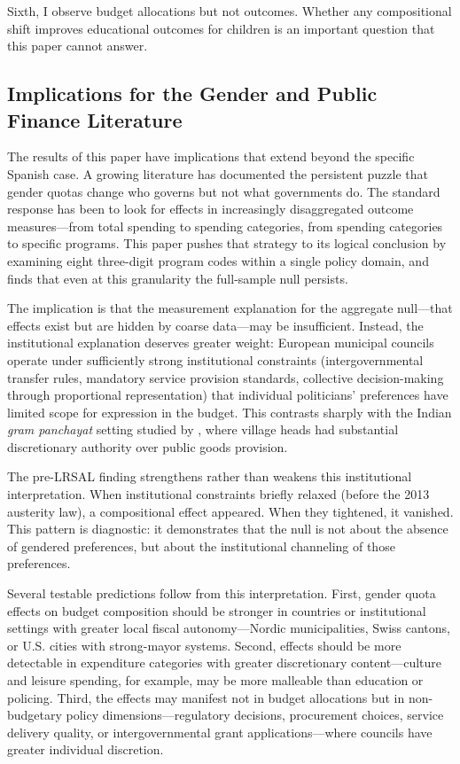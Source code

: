\documentclass[12pt]{article}
\begin{document}
Sixth, I observe budget allocations but not outcomes. Whether any compositional shift improves educational outcomes for children is an important question that this paper cannot answer.

\subsection{Implications for the Gender and Public Finance Literature}

The results of this paper have implications that extend beyond the specific Spanish case. A growing literature has documented the persistent puzzle that gender quotas change who governs but not what governments do. The standard response has been to look for effects in increasingly disaggregated outcome measures---from total spending to spending categories, from spending categories to specific programs. This paper pushes that strategy to its logical conclusion by examining eight three-digit program codes within a single policy domain, and finds that even at this granularity the full-sample null persists.

The implication is that the measurement explanation for the aggregate null---that effects exist but are hidden by coarse data---may be insufficient. Instead, the institutional explanation deserves greater weight: European municipal councils operate under sufficiently strong institutional constraints (intergovernmental transfer rules, mandatory service provision standards, collective decision-making through proportional representation) that individual politicians' preferences have limited scope for expression in the budget. This contrasts sharply with the Indian \emph{gram panchayat} setting studied by \citet{chattopadhyay2004women}, where village heads had substantial discretionary authority over public goods provision.

The pre-LRSAL finding strengthens rather than weakens this institutional interpretation. When institutional constraints briefly relaxed (before the 2013 austerity law), a compositional effect appeared. When they tightened, it vanished. This pattern is diagnostic: it demonstrates that the null is not about the absence of gendered preferences, but about the institutional channeling of those preferences.

Several testable predictions follow from this interpretation. First, gender quota effects on budget composition should be stronger in countries or institutional settings with greater local fiscal autonomy---Nordic municipalities, Swiss cantons, or U.S. cities with strong-mayor systems. Second, effects should be more detectable in expenditure categories with greater discretionary content---culture and leisure spending, for example, may be more malleable than education or policing. Third, the effects may manifest not in budget allocations but in non-budgetary policy dimensions---regulatory decisions, procurement choices, service delivery quality, or intergovernmental grant applications---where councils have greater individual discretion.
\end{document}
